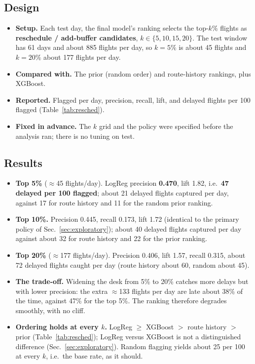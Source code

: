 \documentclass[conference]{IEEEtran}
\begin{document}
\subsection{Design}
\begin{itemize}
\item \textbf{Setup.} Each test day, the final model's ranking selects the top-$k\%$ flights as \textbf{reschedule / add-buffer candidates}, $k\in\{5,10,15,20\}$. The test window has 61 days and about 885 flights per day, so $k=5\%$ is about 45 flights and $k=20\%$ about 177 flights per day.
\item \textbf{Compared with.} The prior (random order) and route-history rankings, plus XGBoost.
\item \textbf{Reported.} Flagged per day, precision, recall, lift, and delayed flights per 100 flagged (Table~\ref{tab:resched}).
\item \textbf{Fixed in advance.} The $k$ grid and the policy were specified before the analysis ran; there is no tuning on test.
\end{itemize}

\subsection{Results}
\begin{itemize}
\item \textbf{Top 5\%} ($\approx$45 flights/day). LogReg precision \textbf{0.470}, lift 1.82, i.e.\ \textbf{47 delayed per 100 flagged}; about 21 delayed flights captured per day, against 17 for route history and 11 for the random prior ranking.
\item \textbf{Top 10\%.} Precision 0.445, recall 0.173, lift 1.72 (identical to the primary policy of Sec.~\ref{sec:exploratory}); about 40 delayed flights captured per day against about 32 for route history and 22 for the prior ranking.
\item \textbf{Top 20\%} ($\approx$177 flights/day). Precision 0.406, lift 1.57, recall 0.315, about 72 delayed flights caught per day (route history about 60, random about 45).
\item \textbf{The trade-off.} Widening the desk from 5\% to 20\% catches more delays but with lower precision: the extra $\approx$133 flights per day are late about 38\% of the time, against 47\% for the top 5\%. The ranking therefore degrades smoothly, with no cliff.
\item \textbf{Ordering holds at every $k$.} LogReg $\ge$ XGBoost $>$ route history $>$ prior (Table~\ref{tab:resched}); LogReg versus XGBoost is not a distinguished difference (Sec.~\ref{sec:exploratory}). Random flagging yields about 25 per 100 at every $k$, i.e.\ the base rate, as it should.
\end{itemize}
\end{document}
